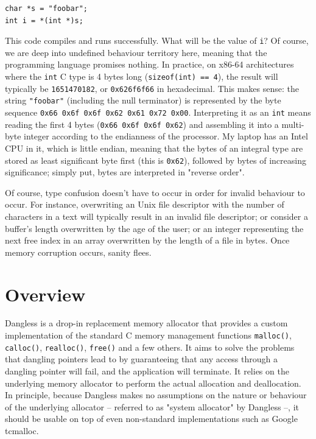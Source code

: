 \begin{lstlisting}
char *s = "foobar";
int i = *(int *)s;
\end{lstlisting}

This code compiles and runs successfully. What will be the value of \lstinline!i!? Of course, we are deep into undefined behaviour territory here, meaning that the programming language promises nothing. In practice, on x86-64 architectures where the \lstinline!int! C type is 4 bytes long (\lstinline!sizeof(int) == 4!), the result will typically be \texttt{1651470182}, or \texttt{0x626f6f66} in hexadecimal. This makes sense: the string \lstinline!"foobar"! (including the null terminator) is represented by the byte sequence \texttt{0x66 0x6f 0x6f 0x62 0x61 0x72 0x00}. Interpreting it as an \lstinline!int! means reading the first 4 bytes (\texttt{0x66 0x6f 0x6f 0x62}) and assembling it into a multi-byte integer according to the endianness of the processor. My laptop has an Intel CPU in it, which is little endian, meaning that the bytes of an integral type are stored as least significant byte first (this is \texttt{0x62}), followed by bytes of increasing significance; simply put, bytes are interpreted in "reverse order".

Of course, type confusion doesn't have to occur in order for invalid behaviour to occur. For instance, overwriting an Unix file descriptor with the number of characters in a text will typically result in an invalid file descriptor; or consider a buffer's length overwritten by the age of the user; or an integer representing the next free index in an array overwritten by the length of a file in bytes. Once memory corruption occurs, sanity flees.


\section{Overview}


Dangless is a drop-in replacement memory allocator that provides a custom implementation of the standard C memory management functions \lstinline!malloc()!, \lstinline!calloc()!, \lstinline!realloc()!, \lstinline!free()! and a few others. It aims to solve the problems that dangling pointers lead to by guaranteeing that any access through a dangling pointer will fail, and the application will terminate. It relies on the underlying memory allocator to perform the actual allocation and deallocation. In principle, because Dangless makes no assumptions on the nature or behaviour of the underlying allocator -- referred to as "system allocator" by Dangless --, it should be usable on top of even non-standard implementations such as Google tcmalloc.

